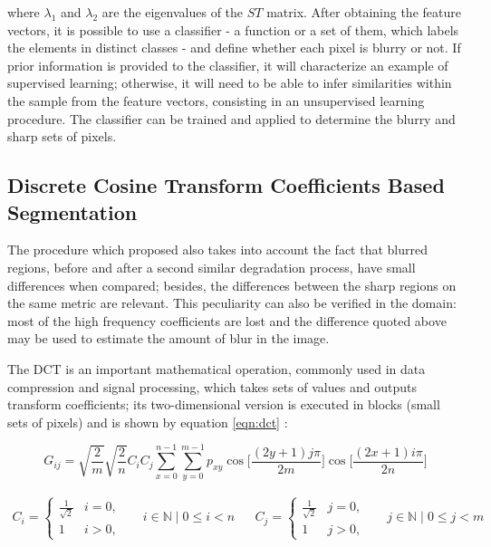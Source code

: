 \noindent where $\lambda_{1}$ and $\lambda_{2}$ are the eigenvalues of the $ST$ matrix. After obtaining the feature vectors, it is possible to use a classifier - a function or a set of them, which labels the elements in distinct classes - and define whether each pixel is blurry or not. If prior information is provided to the classifier, it will characterize an example of supervised learning; otherwise, it will need to be able to
infer similarities within the sample from the feature vectors, consisting in an unsupervised learning procedure. The  classifier can be trained and applied to determine the blurry and sharp sets of pixels.

\subsection{Discrete Cosine Transform Coefficients Based Segmentation}

The procedure which  proposed also takes into account the fact that blurred regions, before and after a second similar degradation process, have small differences when compared; besides, the differences between the sharp regions on the same metric are relevant. This peculiarity can also be verified in the  domain: most of the high frequency coefficients are lost and the difference quoted above may be used to estimate the amount of blur in the image. 

The DCT is an important mathematical operation, commonly used in data compression and signal processing, which takes sets of values and outputs transform coefficients; its two-dimensional version is executed in blocks (small sets of pixels) and is shown by equation \ref{eqn:dct} \cite{salomon2007data}:

\begin{equation}
    \label{eqn:dct}
    G_{ij} = \sqrt{\frac{2}{m}}
             \sqrt{\frac{2}{n}}
             C_{i} C_{j}
             \sum_{x=0}^{n-1}
             \sum_{y=0}^{m-1}
             p_{xy}
             \cos 
                \Bigg[
                \frac
                {(2y + 1)j\pi}
                {2m}
                \Bigg]
            \cos 
                \Bigg[
                \frac
                {(2x + 1)i\pi}
                {2n}
                \Bigg]
\end{equation}

\begin{align*}
C_{i} =
\begin{cases} 
    \frac{1}{\sqrt{2}} & \text{$i = 0$,} \\
    1 & \text{$i > 0$},
\end{cases}
&&
i\in \mathbb{N} \mid 0\leq i < n
&&
C_{j} =
\begin{cases} 
    \frac{1}{\sqrt{2}} & \text{$j = 0$,} \\
    1 & \text{$j > 0$},
\end{cases}
&&
j\in \mathbb{N} \mid 0\leq j < m
\end{align*}

